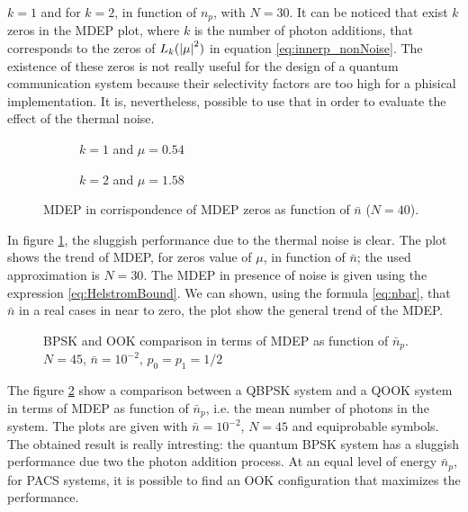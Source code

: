     $k=1$ and for $k=2$, in function of $n_p$, with $N=30$. It can be noticed that exist $k$ zeros
    in the MDEP plot, where $k$ is the number of photon additions, that corresponds to the zeros
    of $L_k(\absolutevalue{\mu}^2)$ in equation \ref{eq:innerp_nonNoise}.
    The existence of these zeros is not really useful for the design of a quantum communication
    system because their selectivity factors are too high for a phisical implementation. It is, 
    nevertheless, possible to use that in order to evaluate the effect of the thermal noise.
    \begin{figure}[t]
        \begin{subfigure}{0.5\textwidth}
            
            \caption{$k=1$ and $\mu = 0.54$}
        \end{subfigure}
        \begin{subfigure}{0.5\textwidth}
            
            \caption{$k=2$ and $\mu = 1.58$}
        \end{subfigure}
        \caption{MDEP in corrispondence of MDEP zeros as function of $\bar{n}$ ($N=40$).}
        \label{fig:3.3}
    \end{figure}
    In figure \ref{fig:3.3}, the sluggish performance due to the thermal noise is clear. The plot
    shows the trend of MDEP, for zeros value of $\mu$, in function of $\bar{n}$; the used approximation
    is $N=30$. The MDEP in presence of noise is given using the expression \ref{eq:HelstromBound}.
    We can shown, using the formula \ref{eq:nbar}, that $\bar{n}$ in a real cases in near to zero, the 
    plot show the general trend of the MDEP.

    \begin{figure}[t]
        
        \caption{BPSK and OOK comparison in terms of MDEP as function of $\bar{n}_p$. \\$N=45$, $\bar{n}=10^{-2}$, $p_0=p_1=1/2$}
        \label{fig:3.4}
    \end{figure}
    
    The figure \ref{fig:3.4} show a comparison between a QBPSK system and a QOOK system in terms of 
    MDEP as function of $\bar{n}_p$, i.e. the mean number of photons in the system. 
    The plots are given with $\bar{n}= 10^{-2}$, $N=45$ and equiprobable symbols.
    The obtained result is really intresting: the quantum BPSK system has a sluggish performance due two 
    the photon addition process. At an equal level of energy $\bar{n}_p$, for PACS systems, it is
    possible to find an OOK configuration that maximizes the performance.
    